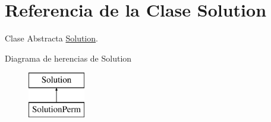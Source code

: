 \hypertarget{class_solution}{\section{Referencia de la Clase Solution}
\label{class_solution}
}


Clase Abstracta \hyperlink{class_solution}{Solution}.  


Diagrama de herencias de Solution\begin{figure}[H]
\begin{center}
\leavevmode
\includegraphics[height=2.000000cm]{class_solution}
\end{center}
\end{figure}
